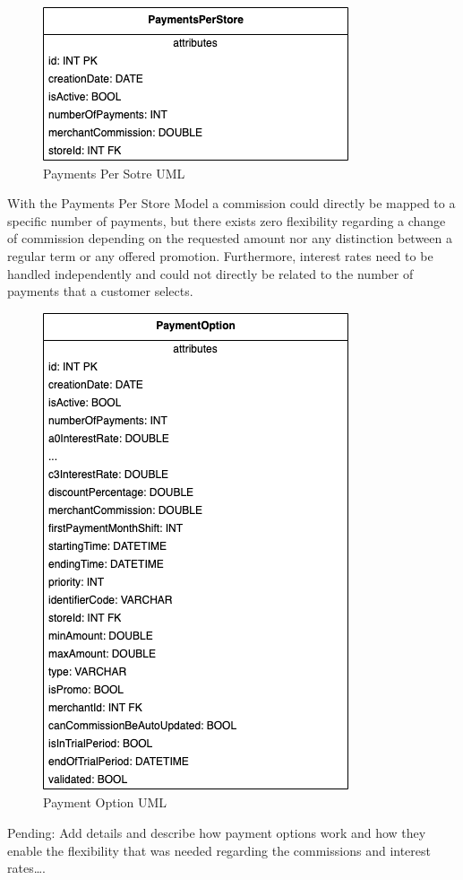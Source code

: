 \begin{figure} [h]
    \centering
    \includegraphics[scale = 0.6]{assets/uml/Payments_Per_Store.png}
    \caption{Payments Per Sotre UML}\label{fig:uml_payments_per_store}
\end{figure}

With the Payments Per Store Model a commission could directly be mapped to a specific number of payments, but there exists zero flexibility regarding a change of commission depending on the requested amount nor any distinction between a regular term or any offered promotion. Furthermore, interest rates need to be handled independently and could not directly be related to the number of payments that a customer selects.

\begin{figure} [h]
    \centering
    \includegraphics[scale = 0.6]{assets/uml/PaymentOptions.png}
    \caption{Payment Option UML}\label{fig:uml_payment_options}
\end{figure}

Pending: 	
Add details and describe how payment options work and how they enable the flexibility that was needed regarding the commissions and interest rates….
